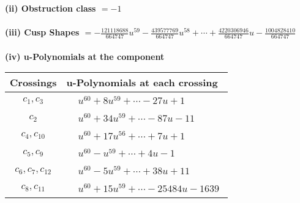 \documentclass[1p]{elsarticle_modified}
\theoremstyle{definition}
\begin{document}
\flushleft \textbf{(ii) Obstruction class $= -1$}\\~\\
\flushleft \textbf{(iii) Cusp Shapes $= -\frac{121118688}{664747} u^{59}-\frac{439577769}{664747} u^{58}+\cdots+\frac{4220306946}{664747} u-\frac{1004828410}{664747}$}\\~\\
\newpage\renewcommand{\arraystretch}{1}
\flushleft \textbf{(iv) u-Polynomials at the component}\newline \\
\begin{tabular}{m{50pt}|m{274pt}}
Crossings & \hspace{64pt}u-Polynomials at each crossing \\
\hline $$\begin{aligned}c_{1},c_{3}\end{aligned}$$&$\begin{aligned}
&u^{60}+8 u^{59}+\cdots-27 u+1
\end{aligned}$\\
\hline $$\begin{aligned}c_{2}\end{aligned}$$&$\begin{aligned}
&u^{60}+34 u^{59}+\cdots-87 u-11
\end{aligned}$\\
\hline $$\begin{aligned}c_{4},c_{10}\end{aligned}$$&$\begin{aligned}
&u^{60}+17 u^{56}+\cdots+7 u+1
\end{aligned}$\\
\hline $$\begin{aligned}c_{5},c_{9}\end{aligned}$$&$\begin{aligned}
&u^{60}- u^{59}+\cdots+4 u-1
\end{aligned}$\\
\hline $$\begin{aligned}c_{6},c_{7},c_{12}\end{aligned}$$&$\begin{aligned}
&u^{60}-5 u^{59}+\cdots+38 u+11
\end{aligned}$\\
\hline $$\begin{aligned}c_{8},c_{11}\end{aligned}$$&$\begin{aligned}
&u^{60}+15 u^{59}+\cdots-25484 u-1639
\end{aligned}$\\
\hline
\end{tabular}\\~\\
\end{document}
